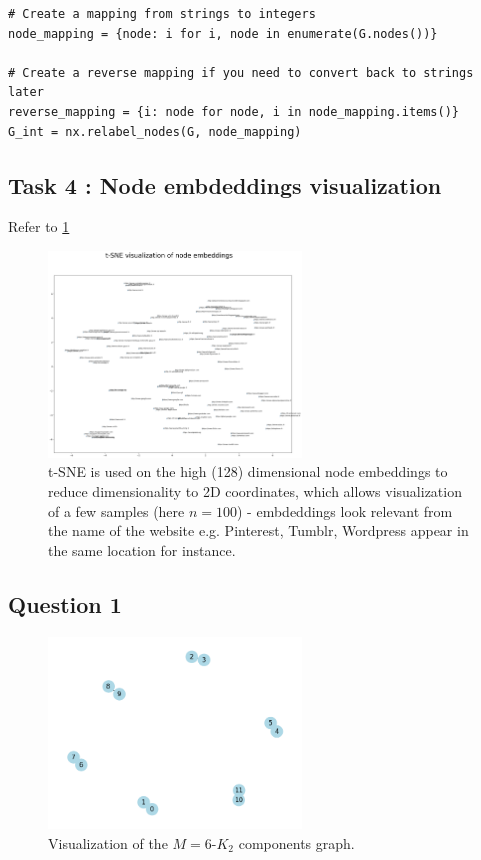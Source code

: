 \documentclass[a4paper]{article}
\begin{document}
\begin{verbatim}
# Create a mapping from strings to integers
node_mapping = {node: i for i, node in enumerate(G.nodes())}

# Create a reverse mapping if you need to convert back to strings later
reverse_mapping = {i: node for node, i in node_mapping.items()}
G_int = nx.relabel_nodes(G, node_mapping)
\end{verbatim}

\subsection*{Task 4 : Node embdeddings visualization}
Refer to  \ref{fig:node_embeddings}
\begin{figure}[ht]
    \centering
    \includegraphics[width=0.6\textwidth]{figures/tSNE_node_embeddings.png}
    \caption{t-SNE is used on the high (128) dimensional node embeddings to reduce dimensionality to 2D coordinates,
    which allows visualization of a few samples (here $n=100$) - embdeddings look relevant from the name of the website e.g.
    Pinterest, Tumblr, Wordpress appear in the same location for instance.}
    \label{fig:node_embeddings}
\end{figure}

\break
\subsection*{Question 1}

\begin{figure}[ht]
    \centering
    \includegraphics[width=0.6\textwidth]{figures/m_k2_graph.png}
    \caption{Visualization of the $M=6$-$K_2$ components graph.}
    \label{fig:m_k2_graph}
\end{figure}
\end{document}
